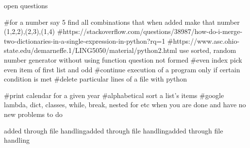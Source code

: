 open questions

#for a number say 5 find all combinations that when added make that number (1,2,2),(2,3),(1,4)
#https://stackoverflow.com/questions/38987/how-do-i-merge-two-dictionaries-in-a-single-expression-in-python?rq=1
#https://www.asc.ohio-state.edu/demarneffe.1/LING5050/material/python2.html
use sorted, random number generator without using function
question not formed #even index pick even item of first list and odd 
#continue execution of a program only if certain condition is met
#delete particular lines of a file with python

#print calendar for a given year 
#alphabetical sort a list's items
#google lambda, dict, classes, while, break, nested for etc  when you are done and have no new problems to do


added through file handlingadded through file handlingadded through file handling
